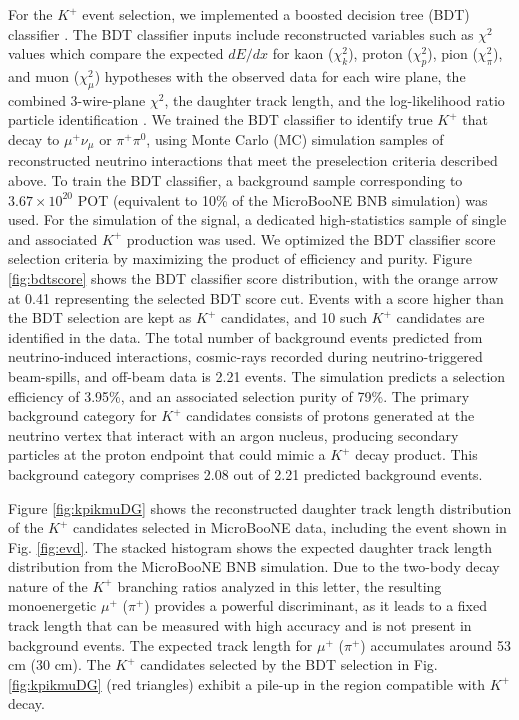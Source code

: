 \documentclass[aps,prd,longbibliography,twocolumn,showpacs,superscriptaddress,floatfix,10pt]{revtex4-1}
\begin{document}
For the $K^{+}$ event selection, we implemented a boosted decision tree (BDT) classifier \cite{tmvaroot}. The BDT classifier inputs include reconstructed variables such as $\chi^2$ values which compare the expected $dE/dx$ for kaon ($\chi^2_{k}$), proton ($\chi^2_{p}$), pion ($\chi^2_{\pi}$), and muon ($\chi^2_{\mu}$) hypotheses with the observed data for each wire plane, the combined 3-wire-plane $\chi^2$, the daughter track length, and the log-likelihood ratio particle identification \cite{nicpaper2021}. We trained the BDT classifier to identify true  $K^{+}$ that decay to $ \mu^+ \nu_\mu $ or $ \pi^+ \pi^0 $, using Monte Carlo (MC) simulation samples of reconstructed neutrino interactions that meet the preselection criteria described above. To train the BDT classifier, a background sample corresponding to $3.67\times10^{20}$ POT (equivalent to 10\% of the MicroBooNE BNB simulation) was used. For the simulation of the signal, a dedicated high-statistics sample of single and associated $K^{+}$ production was used. We optimized the BDT classifier score selection criteria by maximizing the product of efficiency and purity. Figure \ref{fig:bdtscore} shows the BDT classifier score distribution, with the orange arrow at 0.41 representing the selected BDT score cut. Events with a score higher than the BDT selection are kept as $K^{+}$ candidates, and 10 such $K^{+}$ candidates are identified in the data. 
The total number of background events predicted from neutrino-induced interactions, cosmic-rays recorded during neutrino-triggered beam-spills, and off-beam data is 2.21 events.
The simulation predicts a selection efficiency of 3.95\%, and an associated selection purity of 79\%. The primary background category for $K^+$ candidates consists of protons generated at the neutrino vertex that interact with an argon nucleus, producing secondary particles at the proton endpoint that could mimic a $K^+$ decay product. This background category comprises 2.08 out of 2.21 predicted background events.


Figure \ref{fig:kpikmuDG} shows the reconstructed daughter track length distribution of the $K^{+}$ candidates selected in MicroBooNE data, including the event shown in Fig. \ref{fig:evd}. The stacked histogram shows the expected daughter track length distribution from the MicroBooNE BNB simulation. Due to the two-body decay nature of the $K^+$ branching ratios analyzed in this letter, the resulting monoenergetic $\mu^+$ ($\pi^+$)
provides a powerful discriminant, as it leads to a fixed track length that can be measured with high accuracy and is not present in background events. The expected track length for $\mu^+$ ($\pi^+$) accumulates around 53 cm (30 cm).
The $K^{+}$ candidates selected by the BDT selection in Fig. \ref{fig:kpikmuDG} (red triangles) exhibit a pile-up in the region compatible with $K^{+}$ decay. 
\end{document}

